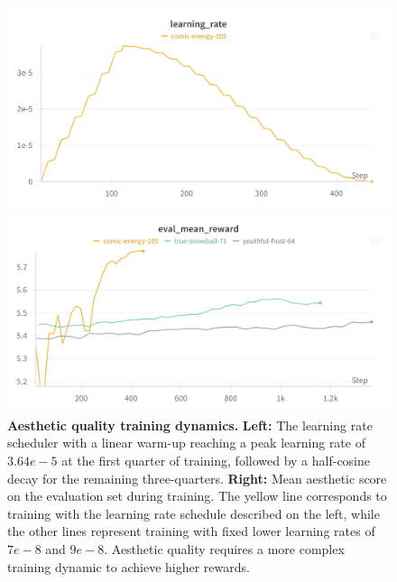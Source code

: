 \begin{figure}[ht]
  \centering
  \begin{minipage}{0.5\textwidth}
      \centering
      \includegraphics[width=1\textwidth]{img/results/laion-lr.png} 
  \end{minipage}\hfill
  \begin{minipage}{0.5\textwidth}
      \centering
      \includegraphics[width=1\textwidth]{img/results/laion-eval-mean-reward.png} 
  \end{minipage}
  \vspace{-8pt}  %
    \captionsetup{width=\textwidth} %
    \caption{\textbf{Aesthetic quality training dynamics.} \textbf{Left:} The learning rate scheduler with a linear warm-up reaching a peak learning rate of $3.64e-5$ at the first quarter of training, followed by a half-cosine decay for the remaining three-quarters. \textbf{Right:} Mean aesthetic score on the evaluation set during training. The yellow line corresponds to training with the learning rate schedule described on the left, while the other lines represent training with fixed lower learning rates of $7e-8$ and $9e-8$. Aesthetic quality requires a more complex training dynamic to achieve higher rewards.}
  \label{fig:laion-train-dynamic} %
\end{figure}


